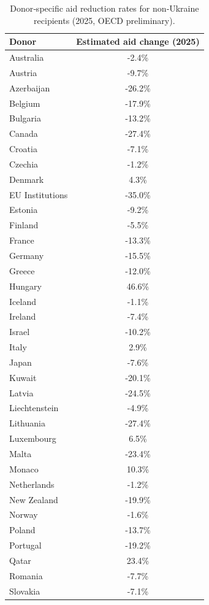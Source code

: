 \documentclass[fleqn,10pt,twocolumn]{wlscirep}
\begin{document}
\begin{table}[h!]
	\caption{Donor‑specific aid reduction rates for non‑Ukraine recipients (2025, OECD preliminary).}
	\label{tab:donor_nonukr_cuts}
	\begin{tabular}{lc}
		\toprule
		Donor & Estimated aid change (2025) \\
		\midrule
		Australia & -2.4\% \\
		Austria & -9.7\% \\
		Azerbaijan & -26.2\% \\
		Belgium & -17.9\% \\
		Bulgaria & -13.2\% \\
		Canada & -27.4\% \\
		Croatia & -7.1\% \\
		Czechia & -1.2\% \\
		Denmark & 4.3\% \\
		EU Institutions & -35.0\% \\
		Estonia & -9.2\% \\
		Finland & -5.5\% \\
		France & -13.3\% \\
		Germany & -15.5\% \\
		Greece & -12.0\% \\
		Hungary & 46.6\% \\
		Iceland & -1.1\% \\
		Ireland & -7.4\% \\
		Israel & -10.2\% \\
		Italy & 2.9\% \\
		Japan & -7.6\% \\
		Kuwait & -20.1\% \\
		Latvia & -24.5\% \\
		Liechtenstein & -4.9\% \\
		Lithuania & -27.4\% \\
		Luxembourg & 6.5\% \\
		Malta & -23.4\% \\
		Monaco & 10.3\% \\
		Netherlands & -1.2\% \\
		New Zealand & -19.9\% \\
		Norway & -1.6\% \\
		Poland & -13.7\% \\
		Portugal & -19.2\% \\
		Qatar & 23.4\% \\
		Romania & -7.7\% \\
		Slovakia & -7.1\% \\

\end{tabular}
\end{table}
\end{document}
